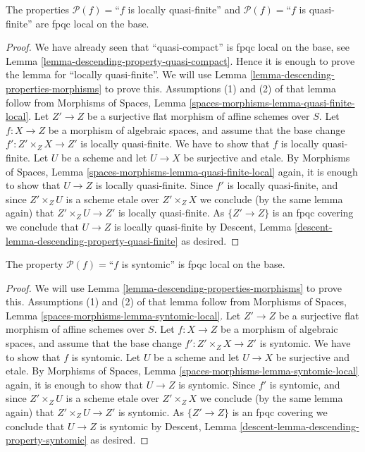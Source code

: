 \begin{lemma}
\label{lemma-descending-property-quasi-finite}
The properties
$\mathcal{P}(f) =$``$f$ is locally quasi-finite''
and
$\mathcal{P}(f) =$``$f$ is quasi-finite''
are fpqc local on the base.
\end{lemma}

\begin{proof}
We have already seen that ``quasi-compact'' is fpqc local on the base, see
Lemma \ref{lemma-descending-property-quasi-compact}. Hence it is enough
to prove the lemma for ``locally quasi-finite''. We will use
Lemma \ref{lemma-descending-properties-morphisms}
to prove this. Assumptions (1) and (2) of that lemma follow from
Morphisms of Spaces,
Lemma \ref{spaces-morphisms-lemma-quasi-finite-local}.
Let $Z' \to Z$ be a surjective flat morphism of affine schemes over $S$.
Let $f : X \to Z$ be a morphism of algebraic spaces, and assume
that the base change $f' : Z' \times_Z X \to Z'$ is locally quasi-finite.
We have to show that $f$ is locally quasi-finite. Let $U$ be a scheme
and let $U \to X$ be surjective and etale. By
Morphisms of Spaces,
Lemma \ref{spaces-morphisms-lemma-quasi-finite-local}
again, it is enough to show that $U \to Z$ is locally quasi-finite.
Since $f'$ is locally quasi-finite, and since $Z' \times_Z U$ is a
scheme etale over $Z' \times_Z X$ we conclude (by the same lemma again) that
$Z' \times_Z U \to Z'$ is locally quasi-finite.
As $\{Z' \to Z\}$ is an fpqc covering we conclude that
$U \to Z$ is locally quasi-finite by
Descent, Lemma \ref{descent-lemma-descending-property-quasi-finite}
as desired.
\end{proof}

\begin{lemma}
\label{lemma-descending-property-syntomic}
The property $\mathcal{P}(f) =$``$f$ is syntomic''
is fpqc local on the base.
\end{lemma}

\begin{proof}
We will use
Lemma \ref{lemma-descending-properties-morphisms}
to prove this. Assumptions (1) and (2) of that lemma follow from
Morphisms of Spaces,
Lemma \ref{spaces-morphisms-lemma-syntomic-local}.
Let $Z' \to Z$ be a surjective flat morphism of affine schemes over $S$.
Let $f : X \to Z$ be a morphism of algebraic spaces, and assume
that the base change $f' : Z' \times_Z X \to Z'$ is syntomic.
We have to show that $f$ is syntomic. Let $U$ be a scheme
and let $U \to X$ be surjective and etale. By
Morphisms of Spaces,
Lemma \ref{spaces-morphisms-lemma-syntomic-local}
again, it is enough to show that $U \to Z$ is syntomic.
Since $f'$ is syntomic, and since $Z' \times_Z U$ is a
scheme etale over $Z' \times_Z X$ we conclude (by the same lemma again) that
$Z' \times_Z U \to Z'$ is syntomic.
As $\{Z' \to Z\}$ is an fpqc covering we conclude that
$U \to Z$ is syntomic by
Descent, Lemma \ref{descent-lemma-descending-property-syntomic}
as desired.
\end{proof}

